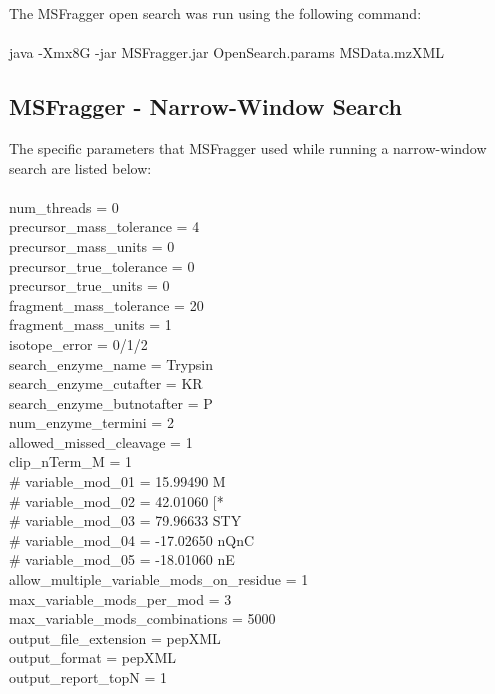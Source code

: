 \documentclass [11pt] {article}
\begin{document}
	The MSFragger open search was run using the following command: \\\\
	java -Xmx8G -jar MSFragger.jar OpenSearch.params MSData.mzXML \\
	
	\subsection {MSFragger - Narrow-Window Search}
	
	The specific parameters that MSFragger used while running a narrow-window search are listed below: \\\\
	num\_threads = 0 \\
	precursor\_mass\_tolerance = 4 \\
	precursor\_mass\_units = 0 \\		
	precursor\_true\_tolerance = 0 \\
	precursor\_true\_units = 0 \\	
	fragment\_mass\_tolerance = 20 \\
	fragment\_mass\_units = 1 \\		
	isotope\_error = 0/1/2 \\	
	search\_enzyme\_name = Trypsin \\
	search\_enzyme\_cutafter = KR \\
	search\_enzyme\_butnotafter = P \\
	num\_enzyme\_termini = 2 \\	
	allowed\_missed\_cleavage = 1 \\	
	clip\_nTerm\_M = 1 \\
	\# variable\_mod\_01 = 15.99490 M \\
	\# variable\_mod\_02 = 42.01060 [* \\
	\# variable\_mod\_03 = 79.96633 STY \\
	\# variable\_mod\_04 = -17.02650 nQnC \\
	\# variable\_mod\_05 = -18.01060 nE \\
	allow\_multiple\_variable\_mods\_on\_residue = 1 \\		
	max\_variable\_mods\_per\_mod = 3	 \\
	max\_variable\_mods\_combinations = 5000 \\		
	output\_file\_extension = pepXML \\
	output\_format = pepXML \\
	output\_report\_topN = 1 \\
\end{document}
